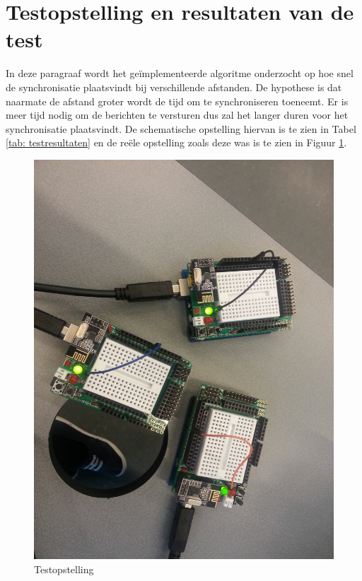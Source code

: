 \documentclass{article}
\begin{document}
\section{Testopstelling en resultaten van de test}
In deze paragraaf wordt het ge\"{i}mplementeerde algoritme onderzocht op hoe snel de synchronisatie plaatsvindt bij verschillende afstanden. De hypothese is dat naarmate de afstand groter wordt de tijd om te synchroniseren toeneemt. Er is meer tijd nodig om de berichten te versturen dus zal het langer duren voor het synchronisatie plaatsvindt. De schematische opstelling hiervan is te zien in Tabel \ref{tab: testresultaten} en de re\"{e}le opstelling zoals deze was is te zien in Figuur \ref{fig: Nodes_tijdens_testen}. 
\begin{figure}[h]
\centering\includegraphics[scale=0.09, angle=90]{Nodes_tijdens_testen}
\caption{Testopstelling}
\label{fig: Nodes_tijdens_testen}
\end{figure}
\end{document}
